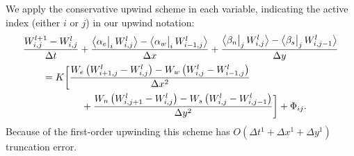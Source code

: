 \documentclass[12pt,final]{amsart}%
\newcommand{\Wlij}{W^l_{i,j}}
\newcommand{\upp}[3]{\big<#1\big|_{#3}\,#2\big>}
\begin{document}
We apply the conservative upwind scheme in each variable, indicating the active index (either $i$ or $j$) in our upwind notation:
\begin{align}
 &\frac{W_{i,j}^{l+1} - \Wlij}{\Delta t} + \frac{\upp{\alpha_e}{\Wlij}{i} - \upp{\alpha_w}{W_{i-1,j}^l}{i}}{\Delta x} + \frac{\upp{\beta_n}{\Wlij}{j} - \upp{\beta_s}{W_{i,j-1}^l}{j}}{\Delta y}  \label{eq:Wfd} \\
      &\qquad = K \bigg[\frac{W_e \left(W_{i+1,j}^l - \Wlij\right) - W_w \left(\Wlij - W_{i-1,j}^l\right)}{\Delta x^2}  \notag \\
      &\qquad\qquad\qquad + \frac{W_n \left(W_{i,j+1}^l - \Wlij\right) - W_s \left(\Wlij - W_{i,j-1}^l\right)}{\Delta y^2}\bigg] + \Phi_{ij}. \notag
\end{align}
Because of the first-order upwinding this scheme has $O(\Delta t^1 + \Delta x^1 + \Delta y^1)$ truncation error.




\small

\end{document}
